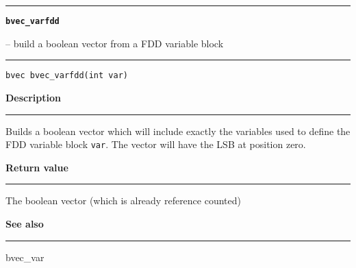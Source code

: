 \begin{minipage}{\textwidth}

\noindent\begin{minipage}{\textwidth}
\rule{\textwidth}{0.5mm}
{\tt\bf bvec\_varfdd }
\--- build a boolean vector from a FDD variable block  \hspace{\fill}
\\\rule[1.5ex]{\textwidth}{0.5mm}
\end{minipage}

\noindent\begin{verbatim}
bvec bvec_varfdd(int var) 
\end{verbatim}

\vspace{\parsep}\noindent
{\bf Description}\\\rule[1.5ex]{\textwidth}{0.2mm}\vspace{-1.5ex}\setlength{\parindent}{1em}
Builds a boolean vector which will include exactly the
           variables used to define the FDD variable block {\tt var}. The
	   vector will have the LSB at position zero. 

\setlength{\parindent}{0em}\vspace{\parsep}\vspace{\baselineskip}\noindent
{\bf Return value}\\\rule[1.5ex]{\textwidth}{0.2mm}\vspace{-1.5ex}
The boolean vector (which is already reference counted) 

\vspace{\parsep}\vspace{\baselineskip}\noindent
{\bf See also}\\\rule[1.5ex]{\textwidth}{0.2mm}\vspace{-1.5ex}
bvec\_var 
\end{minipage}
\vspace{8ex}
